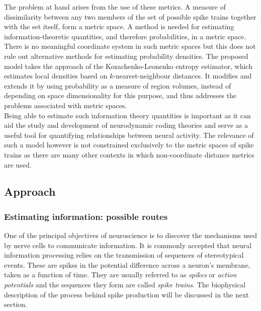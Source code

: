\documentclass[12pt]{extarticle}
\begin{document}
\noindent The problem at hand arises from the use of these metrics. 
A measure of dissimilarity between any two members of 
the set of possible spike trains together with the set itself, form a metric space. 
A method is needed for estimating information-theoretic quantities,
and therefore probabilities, in a metric space. There is no meaningful
coordinate system in such metric spaces but this does not rule out
alternative methods for estimating probability densities. The proposed
model \cite{Houghton} takes the approach of the Kozachenko-Leonenko
\cite{Kozachenko-Leonenko} entropy estimator, which estimates local densities based on
$k$-nearest-neighbour distances. It modifies and extends it by using
probability as a measure of region volumes, instead of depending on
space dimensionality for this purpose, and thus addresses the problems
associated with metric spaces.\\

\noindent Being able to estimate such information theory quantities is
important as it can aid the study and development of neurodynamic%
coding theories and serve as a useful tool for quantifying
relationships between neural activity. The relevance of such a model
however is not constrained exclusively to the metric spaces of spike
trains as there are many other contexts in which non-coordinate
distance metrics are used.



\newpage
\subsection{Approach}
\subsubsection*{Estimating information: possible routes}
\noindent
One of the principal objectives of neuroscience is to discover the
mechanisms used by nerve cells to communicate information. It is commonly 
accepted that neural information processing relies on the transmission of 
sequences of stereotypical events. These are spikes in the potential difference 
across a neuron's membrane, taken as a function of time. They are usually referred 
to as \textit{spikes} or \textit{action potentials} and the sequences they form 
are called \textit{spike trains}. The biophysical description of the process 
behind spike production will be discussed in the next section.\\
\end{document}

